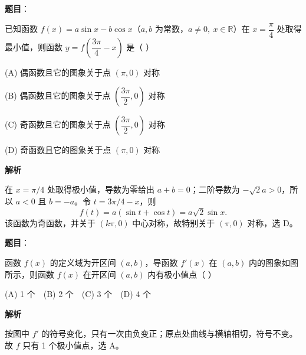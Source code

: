 \begin{answer}

\textbf{题目}：

已知函数 \(f(x)=a\sin x-b\cos x\)（\(a,b\) 为常数，\(a\ne0,\ x\in\mathbb R\)）在 \(x=\dfrac{\pi}{4}\) 处取得最小值，则函数 \(y=f\left(\dfrac{3\pi}{4}-x\right)\) 是（  ）

(A) 偶函数且它的图象关于点 \((\pi,0)\) 对称

(B) 偶函数且它的图象关于点 \(\left(\dfrac{3\pi}{2},0\right)\) 对称

(C) 奇函数且它的图象关于点 \(\left(\dfrac{3\pi}{2},0\right)\) 对称

(D) 奇函数且它的图象关于点 \((\pi,0)\) 对称

\textbf{解析}

在 \(x=\pi/4\) 处取得极小值，导数为零给出 \(a+b=0\)；二阶导数为 \(-\sqrt2a>0\)，所以 \(a<0\) 且 \(b=-a\)。令 \(t=3\pi/4-x\)，则
\nopagebreak[4]
\[
f(t)=a(\sin t+\cos t)=a\sqrt2\sin x.
\]
该函数为奇函数，并关于 \((k\pi,0)\) 中心对称，故特别关于 \((\pi,0)\) 对称，选 D。


\end{answer}
\begin{answer}

\textbf{题目}：

函数 \(f(x)\) 的定义域为开区间 \((a,b)\)，导函数 \(f'(x)\) 在 \((a,b)\) 内的图象如图所示，则函数 \(f(x)\) 在开区间 \((a,b)\) 内有极小值点（  ）

(A) 1 个　(B) 2 个　(C) 3 个　(D) 4 个
\nopagebreak[4]
\begin{center}\end{center}
\nopagebreak[4]
\textbf{解析}

按图中 \(f'\) 的符号变化，只有一次由负变正；原点处曲线与横轴相切，符号不变。故 \(f\) 只有 1 个极小值点，选 A。


\end{answer}
